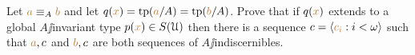 \documentclass[creche.tex]{subfiles}
\begin{document}
\begin{exercise}
Let ${\color{brown} a}\equiv_A{\color{brown} b}$ and let $q({\color{brown} x})={\rm tp}({\color{brown} a}/A)={\rm tp}({\color{brown} b}/A)$. Prove that if $q({\color{brown} x})$ extends to a global $A\jj$invariant type $p({\color{brown} x})\in S(\EuScript U)$ then there is a sequence $c=\langle{\color{brown}c_i}:i<\omega\rangle$ such that ${\color{brown} a},c$ and ${\color{brown} b},c$ are both sequences of $A\jj$indiscernibles.\QED
\end{exercise}
% 
% 
% 
% 
% 
% 
\end{document}
